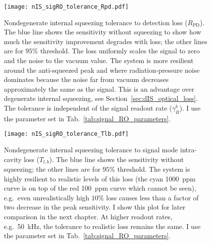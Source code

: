 \begin{figure}
    \centering
    \texttt{[image: nIS\_sigRO\_tolerance\_Rpd.pdf]}
    \caption{ Nondegenerate internal squeezing tolerance to detection loss ($R_\text{PD}$). The blue line shows the sensitivity without squeezing to show how much the sensitivity improvement degrades with loss; the other lines are for $95\%$ threshold. The loss uniformly scales the signal to zero and the noise to the vacuum value. The system is more resilient around the anti-squeezed peak and where radiation-pressure noise dominates because the noise far from vacuum decreases approximately the same as the signal. This is an advantage over degenerate internal squeezing, see Section~\ref{sec:dIS_optical_loss}. The tolerance is independent of the signal readout rate ($\gamma^b_R$). I use the parameter set in Tab.~\ref{tab:signal_RO_parameters}.}
    \label{fig:nIS_sigRO_tolerance_Rpd}
\end{figure}
\begin{figure}[t]
    \centering
    \texttt{[image: nIS\_sigRO\_tolerance\_Tlb.pdf]}
    \caption{ Nondegenerate internal squeezing tolerance to signal mode intra-cavity loss ($T_{l,b}$). The blue line shows the sensitivity without squeezing; the other lines are for $95\%$ threshold.
    The system is highly resilient to realistic levels of this loss (the cyan 1000~ppm curve is on top of the red 100~ppm curve which cannot be seen), e.g.\ even unrealistically high $10\%$ loss causes less than a factor of two decrease in the peak sensitivity. I show this plot for later comparison in the next chapter. At higher readout rates, e.g.\ 50~kHz, the tolerance to realistic loss remains the same. I use the parameter set in Tab.~\ref{tab:signal_RO_parameters}.
    }
    \label{fig:nIS_sigRO_tolerance_Tlb}
\end{figure}
